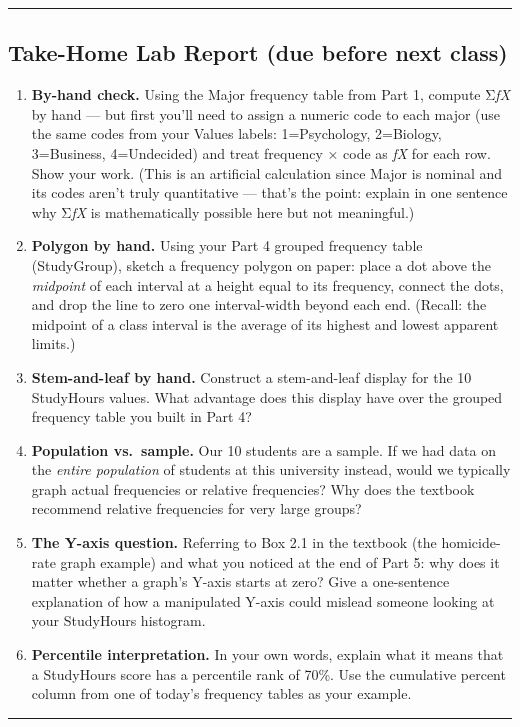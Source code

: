 \documentclass[
  11pt,
]{article}
\providecommand{\tightlist}{%
  \setlength{\itemsep}{0pt}\setlength{\parskip}{0pt}}\usepackage{longtable,booktabs,array}
\begin{document}
\begin{center}\rule{0.5\linewidth}{0.5pt}\end{center}

\subsection{Take-Home Lab Report (due before next
class)}\label{take-home-lab-report-due-before-next-class}

\begin{enumerate}
\def\labelenumi{\arabic{enumi}.}
\tightlist
\item
  \textbf{By-hand check.} Using the Major frequency table from Part 1,
  compute Σ\emph{fX} by hand --- but first you'll need to assign a
  numeric code to each major (use the same codes from your Values
  labels: 1=Psychology, 2=Biology, 3=Business, 4=Undecided) and treat
  frequency × code as \emph{fX} for each row. Show your work. (This is
  an artificial calculation since Major is nominal and its codes aren't
  truly quantitative --- that's the point: explain in one sentence why
  Σ\emph{fX} is mathematically possible here but not meaningful.)
\item
  \textbf{Polygon by hand.} Using your Part 4 grouped frequency table
  (StudyGroup), sketch a frequency polygon on paper: place a dot above
  the \emph{midpoint} of each interval at a height equal to its
  frequency, connect the dots, and drop the line to zero one
  interval-width beyond each end. (Recall: the midpoint of a class
  interval is the average of its highest and lowest apparent limits.)
\item
  \textbf{Stem-and-leaf by hand.} Construct a stem-and-leaf display for
  the 10 StudyHours values. What advantage does this display have over
  the grouped frequency table you built in Part 4?
\item
  \textbf{Population vs.~sample.} Our 10 students are a sample. If we
  had data on the \emph{entire population} of students at this
  university instead, would we typically graph actual frequencies or
  relative frequencies? Why does the textbook recommend relative
  frequencies for very large groups?
\item
  \textbf{The Y-axis question.} Referring to Box 2.1 in the textbook
  (the homicide-rate graph example) and what you noticed at the end of
  Part 5: why does it matter whether a graph's Y-axis starts at zero?
  Give a one-sentence explanation of how a manipulated Y-axis could
  mislead someone looking at your StudyHours histogram.
\item
  \textbf{Percentile interpretation.} In your own words, explain what it
  means that a StudyHours score has a percentile rank of 70\%. Use the
  cumulative percent column from one of today's frequency tables as your
  example.
\end{enumerate}

\begin{center}\rule{0.5\linewidth}{0.5pt}\end{center}
\end{document}
